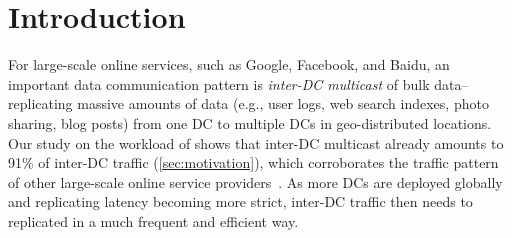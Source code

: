\section{Introduction}

For large-scale online services, such as Google, Facebook, and
Baidu, an important data communication pattern is {\em inter-DC
multicast} of bulk data--replicating massive amounts of data (e.g.,
user logs, web search indexes, photo sharing, blog posts)
from one DC to multiple DCs in geo-distributed locations.
Our study on the workload of \company shows that inter-DC multicast
already amounts to 91\% of inter-DC traffic (\Section\ref{sec:motivation}),
which corroborates the traffic pattern of other large-scale online
service providers~\cite{kumar2015bwe,zhang2016piebridge}.
As more DCs are deployed globally and replicating latency becoming more strict,
inter-DC traffic then needs to replicated in a much frequent and efficient way.




